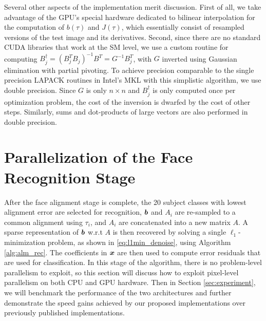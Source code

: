 Several other aspects of the implementation merit discussion.  
First of all, we take advantage of the GPU's special hardware dedicated to bilinear interpolation
for the computation of $b(\tau)$ and $J(\tau)$, which essentially consist of resampled
versions of the test image and its derivatives.
Second, since there are no standard CUDA libraries that work at the SM level, we use a
custom routine for computing $B_j^\dagger = (B_j^TB_j)^{-1} B^T = G^{-1} B_j^T$, with $G$
inverted using Gaussian elimination with partial pivoting.  To achieve
precision comparable to the single precision LAPACK routines in Intel's MKL
with this simplistic algorithm, we use double precision.  Since $G$ is only $n
\times n$ and $B_j^\dagger$ is only computed once per optimization problem, the
cost of the inversion is dwarfed by the cost of other steps.  
Similarly, sums and dot-products of large vectors are also
performed in double precision.

\section{Parallelization of the Face Recognition Stage} 
\label{sec:recognition}
After the face alignment stage is complete, the 20 subject classes with lowest
alignment error are selected for recognition, $\boldsymbol{b}$ and $A_i$ are re-sampled to a common alignment
using $\tau_i$, and $A_i$ are concatenated into a new matrix $A$.
A sparse representation of $\boldsymbol{b}$ w.r.t $A$ is then recovered
by solving a single $\ell_1$-minimization problem, as shown
in \eqref{eq:l1min_denoise}, using Algorithm \ref{alg:alm_rec}.  The
coefficients in ${\boldsymbol{x}}$ are then used to compute error residuals that are used for
classification.  
In this stage of the algorithm, there is no problem-level
parallelism to exploit, so this section will discuss how to exploit pixel-level parallelism
on both CPU and GPU hardware.
Then in Section \ref{sec:experiment}, we will benchmark the
performance of the two architectures and further demonstrate the speed
gains achieved by our proposed implementations over previously published implementations.

